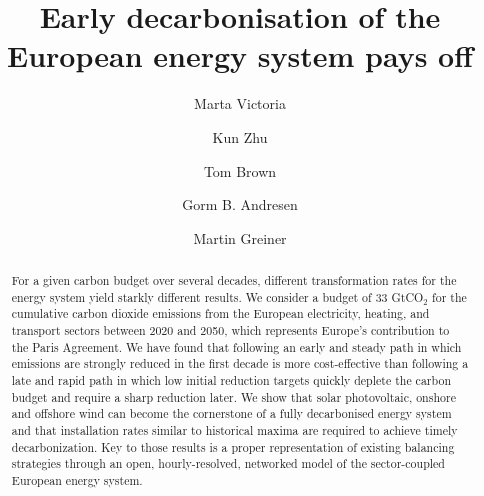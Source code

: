 \documentclass[5p]{elsarticle} %
\begin{document}
\begin{frontmatter}

\title{Early decarbonisation of the European energy system pays off}
\author[mymainaddress,iClimate]{Marta Victoria}
\author[mymainaddress]{Kun Zhu}
\author[kitaddress]{Tom Brown}
\author[mymainaddress,iClimate]{Gorm B. Andresen}
\author[mymainaddress,iClimate]{Martin Greiner}
\address[mymainaddress]{Department of Engineering, Aarhus University, Inge Lehmanns Gade 10, 8000 Aarhus, Denmark}
\address[iClimate]{iCLIMATE Interdisciplinary Centre for Climate Change, Aarhus University}
\address[kitaddress]{Institute for Automation and Applied Informatics (IAI), Karlsruhe Institute of Technology (KIT), Forschungszentrum 449, 76344, Eggenstein-Leopoldshafen, Germany}


\begin{abstract}

For a given carbon budget over several decades, different transformation rates for the energy system yield starkly different results. We consider a budget of 33 GtCO$_2$ for the cumulative carbon dioxide emissions from the European electricity, heating, and transport sectors between 2020 and 2050, which represents Europe's contribution to the Paris Agreement. We have found that following an early and steady path in which emissions are strongly reduced in the first decade is more cost-effective than following a late and rapid path in which low initial reduction targets quickly deplete the carbon budget and require a sharp reduction later. We show that solar photovoltaic, onshore and offshore wind can become the cornerstone of a fully decarbonised energy system and that installation rates similar to historical maxima are required to achieve timely decarbonization. Key to those results is a proper representation of existing balancing strategies through an open, hourly-resolved, networked model of the sector-coupled European energy system.



\end{abstract}
\end{frontmatter}
\end{document}
